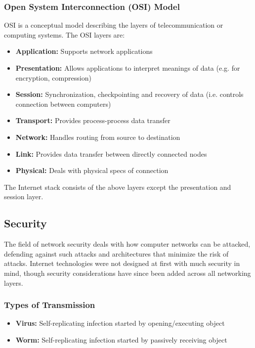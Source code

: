 \documentclass[12pt,titlepage]{article}
\begin{document}
      \subsubsection{Open System Interconnection (OSI) Model}
        OSI is a conceptual model describing the layers of telecommunication or computing systems. The OSI layers are:
        \begin{itemize}
          \item \textbf{Application:} Supports network applications
          \item \textbf{Presentation:} Allows applications to interpret meanings of data (e.g. for encryption, compression)
          \item \textbf{Session:} Synchronization, checkpointing and recovery of data (i.e. controls connection between computers)
          \item \textbf{Transport:} Provides process-process data transfer
          \item \textbf{Network:} Handles routing from source to destination
          \item \textbf{Link:} Provides data transfer between directly connected nodes
          \item \textbf{Physical:} Deals with physical specs of connection
        \end{itemize}

        The Internet stack consists of the above layers except the presentation and session layer.

      \subsection{Security}
        The field of network security deals with how computer networks can be attacked, defending against such attacks and architectures
        that minimize the risk of attacks. Internet technologies were not designed at first with much security in mind, though security
        considerations have since been added across all networking layers.

      \subsubsection{Types of Transmission}
        \begin{itemize}
          \item \textbf{Virus:} Self-replicating infection started by opening/executing object
          \item \textbf{Worm:} Self-replicating infection started by passively receiving object
        \end{itemize}
\end{document}
